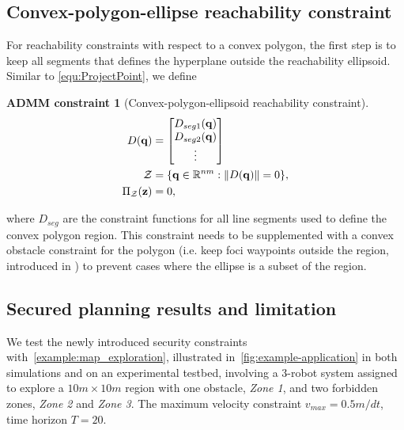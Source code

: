 \documentclass[10pt,twocolumn,twoside]{IEEEtran}
\newtheorem{constraint}{ADMM constraint}
\def\sZ{\mathcal{Z}}
\begin{document}
\subsection{Convex-polygon-ellipse reachability constraint}\label{sec:ellipse-region-constraint} 
For reachability constraints with respect to a convex polygon, the first step is to keep all segments that defines the hyperplane outside the reachability ellipsoid. Similar to \eqref{equ:ProjectPoint}, we define
\begin{constraint}[Convex-polygon-ellipsoid reachability constraint]\label{constraint:polygon-ellipsoid}
\begin{align}
D(\vq) &= \bmat{D_{seg1}(\vq)\\D_{seg2}(\vq)\\ \vdots} \label{eq:region_ellipsoid_constraint}\\
  \sZ &= \{\vq\in\mathbb{R}^{nm}:\norm{D(\vq)} = 0 \},\\
   \Pi_\sZ(\vz) & = 0, 
\end{align}
\end{constraint}
where $D_{seg}$ are the constraint functions for all line segments used to define the convex polygon region. This constraint needs to be supplemented with a convex obstacle constraint for the polygon (i.e. keep foci waypoints outside the region, introduced in \cite{yang2020multi}) to prevent cases where the ellipse is a subset of the region.

\subsection{Secured planning results and limitation}\label{sec:ADMM-simulation}

We test the newly introduced security constraints with~\cref{example:map_exploration}, illustrated in~\cref{fig:example-application} in both simulations and on an experimental testbed, involving a 3-robot system assigned to explore a $10m\times10m$ region with one obstacle, \emph{Zone 1}, and two forbidden zones, \emph{Zone 2} and \emph{Zone 3}. The maximum velocity constraint $v_{max}=0.5m/dt$, time horizon $T=20$. %
\end{document}
